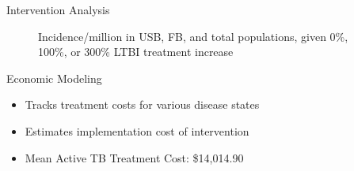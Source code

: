 \documentclass[final]{beamer}
\begin{document}
\begin{frame}
\begin{columns}[T]
\begin{column}{.3\textwidth}
\begin{block}{Intervention Analysis}
\begin{figure}[h]
\begin{minipage}[c]{0.6\textwidth}
          \end{minipage}
          \hspace{0.5em}
          \begin{minipage}[c]{0.35\textwidth}
            \caption{Incidence/million in USB, FB, and total populations,
                     given 0\%, 100\%, or 300\% LTBI treatment increase}
          \end{minipage}
          \label{fig:incLTBItrmt_incidence}
        \end{figure}
      \end{block}
      \begin{block}{Economic Modeling}
        \begin{itemize}
          \item Tracks treatment costs for various disease states
          \item Estimates implementation cost of intervention
          \item Mean Active TB Treatment Cost: \$14,014.90
            
        \end{itemize}
        \vspace{.5em}
            \begin{figure}[h]



\end{figure}
\end{block}
\end{column}
\end{columns}
\end{frame}
\end{document}
